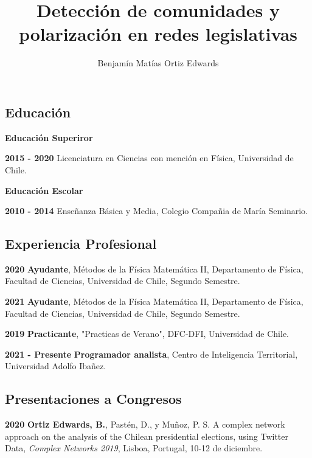 \documentclass{proyectotesis}
\title{Detección de comunidades y polarización en redes legislativas}
\author{Benjamín Matías Ortiz Edwards}
\begin{document}
\maketitlepage
\makepersonalinfo

\subsection{Educación}
\begin{cvlist}{}
\item[\textbf{Educación Superiror}] 
\item[\textbf{2015 - 2020}] Licenciatura en Ciencias con mención en Física, Universidad de Chile.
\item[\bf Educación Escolar]
\item[\textbf{2010 - 2014}]  Enseñanza Básica y Media, Colegio Compañia de María Seminario.
\end{cvlist}

\subsection{Experiencia Profesional}
\begin{cvlist}{}
\item[\textbf{2020}]   \textbf{Ayudante},  Métodos de la Física Matemática II, Departamento de Física, Facultad de Ciencias, Universidad de Chile, Segundo Semestre.
\item[\textbf{2021}]   \textbf{Ayudante},  Métodos de la Física Matemática II, Departamento de Física, Facultad de Ciencias, Universidad de Chile, Segundo Semestre.
\item[\textbf{2019}]  \textbf{Practicante}, "Practicas de Verano", DFC-DFI, Universidad de Chile.   
\item[\textbf{2021 - Presente}] \textbf{Programador analista}, Centro de Inteligencia Territorial, Universidad Adolfo Ibañez. 

\end{cvlist}

\subsection{Presentaciones a Congresos}

\begin{cvlist}{}
\item[\textbf{2020}] \textbf{Ortiz Edwards, B.}, Pastén, D., y Muñoz, P. S. A complex network approach on the analysis of the Chilean presidential elections, using Twitter Data, {\it Complex Networks 2019}, Lisboa, Portugal, 10-12 de diciembre.

\end{cvlist}
\end{document}
